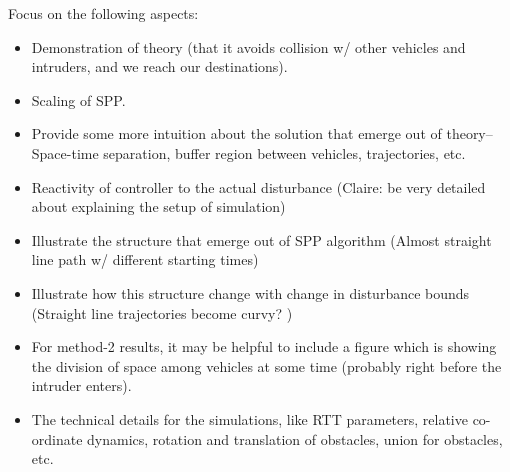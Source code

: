 

Focus on the following aspects:
\begin{itemize}
\item Demonstration of theory (that it avoids collision w/ other vehicles and intruders, and we reach our destinations).
\item Scaling of SPP.
\item Provide some more intuition about the solution that emerge out of theory-- Space-time separation, buffer region between vehicles, trajectories, etc.
\item Reactivity of controller to the actual disturbance (Claire: be very detailed about explaining the setup of simulation)
\item Illustrate the structure that emerge out of SPP algorithm (Almost straight line path w/ different starting times)
\item Illustrate how this structure change with change in disturbance bounds (Straight line trajectories become curvy? )
\item For method-2 results, it may be helpful to include a figure which is showing the division of space among vehicles at some time (probably right before the intruder enters).
\item The technical details for the simulations, like RTT parameters, relative co-ordinate dynamics, rotation and translation of obstacles, union for obstacles, etc. 
\end{itemize}